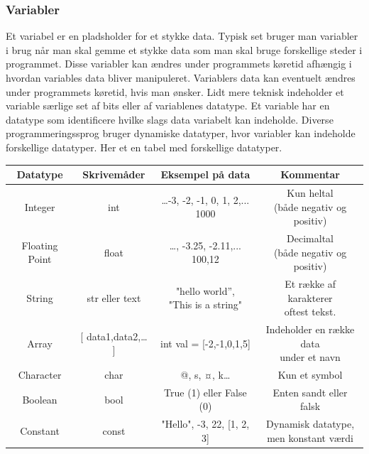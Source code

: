 \documentclass[12pt]{article}
\begin{document}
\subsubsection{Variabler}
Et variabel er en pladsholder for et stykke data. Typisk set bruger man variabler i brug når man skal gemme et stykke data som man skal bruge forskellige steder i programmet. Disse variabler kan ændres under programmets køretid afhængig i hvordan variables data bliver manipuleret. Variablers data kan eventuelt ændres under programmets køretid, hvis man ønsker. Lidt mere teknisk indeholder et variable særlige set af bits eller af variablenes datatype. Et variable har en datatype som identificere hvilke slags data variabelt kan indeholde. Diverse programmeringssprog bruger dynamiske datatyper, hvor variabler kan indeholde forskellige datatyper. Her et en tabel med forskellige datatyper.
\begin{table}[ht]
  \centering
  \begin{tabular}{ |c|c|c|c| }
   \hline
   \textbf{Datatype} & \textbf{Skrivemåder} & \textbf{Eksempel på data} & \textbf{Kommentar} \\ 
   \hline
   Integer & int & \small{…-3, -2, -1, 0, 1, 2,... 1000} & \shortstack{Kun heltal\\ \footnotesize{(både negativ og positiv)}} \\
   \hline
   Floating Point & float & …, -3.25, -2.11,... 100,12  & \shortstack{Decimaltal\\ \footnotesize{(både negativ og positiv)}} \\ 
   \hline
   String & str eller text & \shortstack{"hello world”, \\ "This is a string"}  &  \shortstack{Et række af karakterer\\ oftest tekst.} \\ 
   \hline
   Array & [ data1,data2,… ] & int val = [-2,-1,0,1,5] & \shortstack{Indeholder en række data \\ under et navn} \\ 
   \hline
   Character & char & @, s, ¤, k…  & Kun et symbol \\ 
   \hline
   Boolean & bool & True (1) eller False (0)  & Enten sandt eller falsk \\ 
   \hline
   Constant & const & "Hello", -3, 22, [1, 2, 3] & \shortstack{Dynamisk datatype, \\ men konstant værdi} \\ 
   \hline
  \end{tabular}
\end{table}
\end{document}
